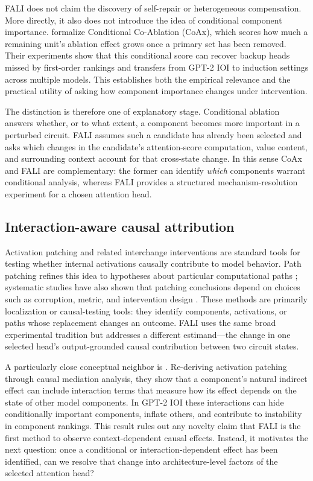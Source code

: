 \documentclass[pdflatex,sn-mathphys-ay]{sn-jnl}
\begin{document}
FALI does not claim the discovery of self-repair or heterogeneous compensation. More directly, it also does not introduce the idea of conditional component importance. \citet{gong2026coax} formalize Conditional Co-Ablation (CoAx), which scores how much a remaining unit's ablation effect grows once a primary set has been removed. Their experiments show that this conditional score can recover backup heads missed by first-order rankings and transfers from GPT-2 IOI to induction settings across multiple models. This establishes both the empirical relevance and the practical utility of asking how component importance changes under intervention.

The distinction is therefore one of explanatory stage. Conditional ablation answers whether, or to what extent, a component becomes more important in a perturbed circuit. FALI assumes such a candidate has already been selected and asks which changes in the candidate's attention-score computation, value content, and surrounding context account for that cross-state change. In this sense CoAx and FALI are complementary: the former can identify \emph{which} components warrant conditional analysis, whereas FALI provides a structured mechanism-resolution experiment for a chosen attention head.

\subsection{Interaction-aware causal attribution}\label{sec:rw-interaction}

Activation patching and related interchange interventions are standard tools for testing whether internal activations causally contribute to model behavior. Path patching refines this idea to hypotheses about particular computational paths \citep{goldowskydill2023pathpatching}; systematic studies have also shown that patching conclusions depend on choices such as corruption, metric, and intervention design \citep{zhang2024activationpatching,heimersheim2024activationpatching}. These methods are primarily localization or causal-testing tools: they identify components, activations, or paths whose replacement changes an outcome. FALI uses the same broad experimental tradition but addresses a different estimand---the change in one selected head's output-grounded causal contribution between two circuit states.

A particularly close conceptual neighbor is \citet{vaidyanathan2026curse}. Re-deriving activation patching through causal mediation analysis, they show that a component's natural indirect effect can include interaction terms that measure how its effect depends on the state of other model components. In GPT-2 IOI these interactions can hide conditionally important components, inflate others, and contribute to instability in component rankings. This result rules out any novelty claim that FALI is the first method to observe context-dependent causal effects. Instead, it motivates the next question: once a conditional or interaction-dependent effect has been identified, can we resolve that change into architecture-level factors of the selected attention head?
\end{document}
